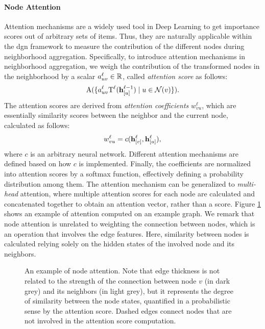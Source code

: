 \paragraph{Node Attention}
Attention mechanisms \citep{bahdanau2015attention} are a widely used tool in Deep Learning to get importance scores out of arbitrary sets of items. Thus, they are naturally applicable within the \gls{dgn} framework to measure the contribution of the different nodes during neighborhood aggregation. Specifically, to introduce attention mechanisms in neighborhood aggregation, we weigh the contribution of the transformed nodes in the neighborhood by a scalar $a^{\ell}_{uv} \in \mathbb{R}$, called \emph{attention score} as follows:
$$\Fun{A}(\Set{a^{\ell}_{uv}\Fun{T}^{\ell}(\Elem{h}{u}^{\ell-1}) \mid u \in \mathcal{N}(v)}).$$
The attention scores are derived from \emph{attention coefficients} $w_{vu}^{\ell}$, which are essentially similarity scores between the neighbor and the current node, calculated as follows:
$$w_{vu}^{\ell} = c(\Elem{h}{v}^{\ell}, \Elem{h}{u}^{\ell}),$$
where $c$ is an arbitrary neural network. Different attention mechanisms are defined based on how $c$ is implemented. Finally, the coefficients are normalized into attention scores by a softmax function, effectively defining a probability distribution among them. The attention mechanism can be generalized to \emph{multi-head} attention, where multiple attention scores for each node are calculated and concatenated together to obtain an attention vector, rather than a score. Figure \ref{fig:attention} shows an example of attention computed on an example graph. We remark that node attention is unrelated to weighting the connection between nodes, which is an operation that involves the edge features. Here, similarity between nodes is calculated relying solely on the hidden states of the involved node and its neighbors.

\begin{figure}[h!]
    \centering
    \resizebox{.35\textwidth}{!}{}
    \caption{An example of node attention. Note that edge thickness is not related to the strength of the connection between node $v$ (in dark grey) and its neighbors (in light grey), but it represents the degree of similarity between the node states, quantified in a probabilistic sense by the attention score. Dashed edges connect nodes that are not involved in the attention score computation.}
    \label{fig:attention}
\end{figure}

